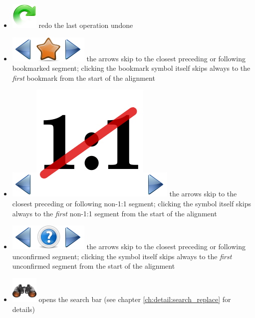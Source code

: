 \documentclass[a4paper,10pt,oneside]{book}
\begin{document}
\begin{itemize}
	\item \includegraphics[height=2ex]{../images/48/edit-redo.png} redo the last operation undone
	\item \includegraphics[height=2ex]{../images/48/go-previous-view.png}\includegraphics[height=2ex]{../images/48/mark.png}\includegraphics[height=2ex]{../images/48/go-next-view.png} the arrows skip to the closest preceding or following bookmarked segment; clicking the bookmark symbol itself skips always to the \emph{first} bookmark from the start of the alignment
	\item \includegraphics[height=2ex]{../images/48/go-previous-view.png}\includegraphics[height=2ex]{non11.pdf}\includegraphics[height=2ex]{../images/48/go-next-view.png} the arrows skip to the closest preceding or following non-1:1 segment; clicking the symbol itself skips always to the \emph{first} non-1:1 segment from the start of the alignment
	\item \includegraphics[height=2ex]{../images/48/go-previous-view.png}\includegraphics[height=2ex]{../images/48/unconfirmed.png}\includegraphics[height=2ex]{../images/48/go-next-view.png} the arrows skip to the closest preceding or following unconfirmed segment; clicking the symbol itself skips always to the \emph{first} unconfirmed segment from the start of the alignment
	\item \includegraphics[height=2ex]{../images/48/search.png} opens the search bar (see chapter \ref{ch:detail:search_replace} for details)
\end{itemize}
\end{document}
